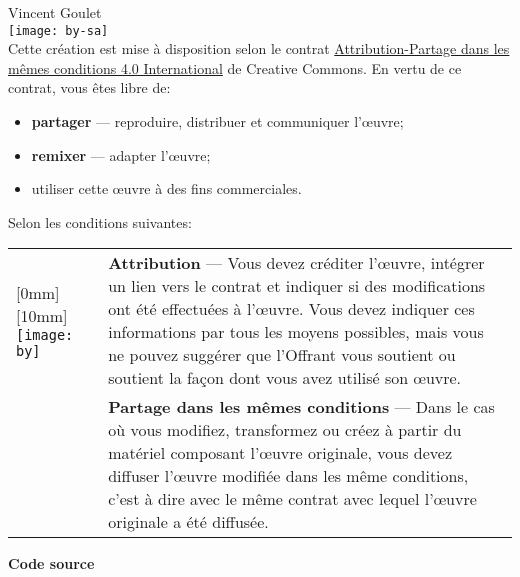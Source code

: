 
\begin{frame}[t,plain,fragile=singleslide]
  \tiny
  \vspace*{10mm}

  \begin{adjustwidth}{15mm}{15mm}
    {\textcopyright} {\year} Vincent Goulet \\[4mm]

    \texttt{[image: by-sa]} \\%

    Cette création est mise à disposition selon le contrat
    \href{http://creativecommons.org/licenses/by-sa/4.0/deed.fr}{%
      Attribution-Partage dans les mêmes conditions 4.0 International}
    de Creative Commons. En vertu de ce contrat, vous êtes libre de:
    \begin{itemize}
    \item \textbf{partager} --- reproduire, distribuer et communiquer
      l'{\oe}uvre;
    \item \textbf{remixer} --- adapter l'{\oe}uvre;
    \item utiliser cette {\oe}uvre à des fins commerciales.
    \end{itemize}
    Selon les conditions suivantes: \vspace*{2mm}

    \begin{tabularx}{\linewidth}{@{}lX@{}}
      \raisebox{-5.5mm}[0mm][10mm]{%
      \texttt{[image: by]}} &
      \textbf{Attribution} --- Vous devez créditer l'{\oe}uvre, intégrer
      un lien vers le contrat et indiquer si des modifications ont été
      effectuées à l'{\oe}uvre. Vous devez indiquer ces informations par
      tous les moyens possibles, mais vous ne pouvez suggérer que
      l'Offrant vous soutient ou soutient la façon dont vous avez
      utilisé son {\oe}uvre. \\
      \raisebox{-5.5mm}{\texttt{[image: sa]}}
      & \textbf{Partage dans les mêmes conditions} --- Dans le cas où
      vous modifiez, transformez ou créez à partir du matériel composant
      l'{\oe}uvre originale, vous devez diffuser l'{\oe}uvre modifiée
      dans les même conditions, c'est à dire avec le même contrat avec
      lequel l'{\oe}uvre originale a été diffusée.
    \end{tabularx}
    \vspace{5mm}

    \textbf{Code source} \\
  \end{adjustwidth}
\end{frame}

